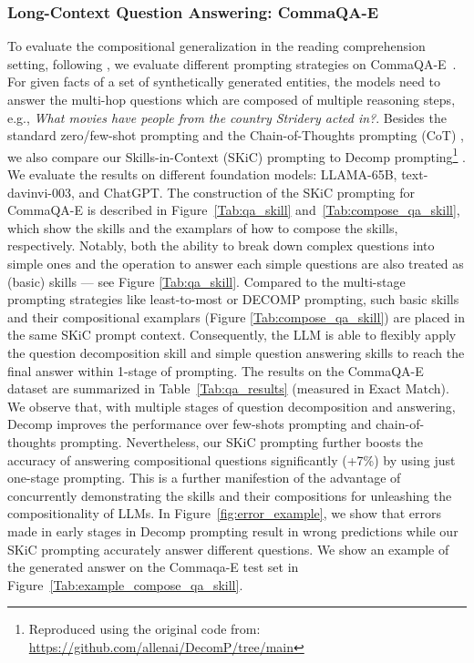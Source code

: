\subsubsection{Long-Context Question Answering: CommaQA-E}  
To evaluate the compositional generalization in the reading comprehension setting, following \citeauthor{khot2022decomposed}, we evaluate different prompting strategies on CommaQA-E~\citep{khot2021hey}. For given facts of a set of synthetically generated entities, the models need to answer the multi-hop questions which are composed of multiple reasoning steps, e.g., \textit{What movies have people from the country Stridery acted in?}. Besides the standard zero/few-shot prompting \citep{brown2020language} and the Chain-of-Thoughts prompting (CoT) \citep{wei2022chain}, we also compare our Skills-in-Context (SKiC) prompting to Decomp prompting\footnote{Reproduced using the original code from: \url{https://github.com/allenai/DecomP/tree/main}} \citep{khot2022decomposed}. We evaluate the results on different foundation models: LLAMA-65B, text-davinvi-003, and ChatGPT. The construction of the SKiC prompting for CommaQA-E is described in Figure~\ref{Tab:qa_skill} and~\ref{Tab:compose_qa_skill}, which show the skills and the examplars of how to compose the skills, respectively. Notably, both the ability to break down complex questions into simple ones and the operation to answer each simple questions are also treated as (basic) skills --- see Figure \ref{Tab:qa_skill}. Compared to the multi-stage prompting strategies like least-to-most or DECOMP prompting, such basic skills and their compositional examplars (Figure \ref{Tab:compose_qa_skill}) are placed in the same SKiC prompt context. Consequently, the LLM is able to flexibly apply the question decomposition skill and simple question answering skills to reach the final answer within 1-stage of prompting. The results on the CommaQA-E dataset are summarized in Table~\ref{Tab:qa_results} (measured in Exact Match). We observe that, with multiple stages of question decomposition and answering, Decomp improves the performance over few-shots prompting and chain-of-thoughts prompting. Nevertheless, our SKiC prompting further boosts the accuracy of answering compositional questions significantly (+7\%) by using just one-stage prompting. This is a further manifestion of the advantage of concurrently demonstrating the skills and their compositions for unleashing the compositionality of LLMs. In Figure~\ref{fig:error_example}, we show that errors made in early stages in Decomp prompting result in wrong predictions while our SKiC prompting accurately answer different questions. We show an example of the generated answer on the Commaqa-E test set in Figure~\ref{Tab:example_compose_qa_skill}.





